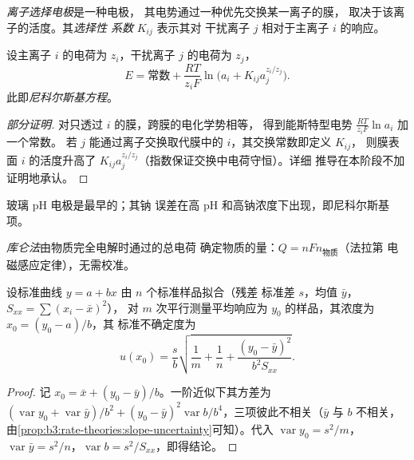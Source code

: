 \begin{definition}\label{def:b3:electrode-kinetics:ise}
\emph{离子选择电极}是一种电极，
其电势通过一种优先交换某一离子的膜，
取决于该离子的活度。其\emph{选择性
系数} $K_{ij}$ 表示其对
干扰离子 $j$ 相对于主离子 $i$ 的响应。
\end{definition}

\begin{proposition}[尼科尔斯基方程]\label{prop:b3:electrode-kinetics:nikolsky}
设主离子 $i$ 的电荷为 $z_i$，干扰离子 $j$ 的电荷为 $z_j$，
\[
  E = \text{常数} + \frac{RT}{z_iF}\ln\bigl(a_i + K_{ij}a_j^{z_i/z_j}\bigr) .
\]
此即\emph{尼科尔斯基方程}。
\end{proposition}

\begin{proof}[部分证明]
对只透过 $i$ 的膜，跨膜的电化学势相等，
得到能斯特型电势 $\frac{RT}{z_iF}\ln a_i$ 加一个常数。
若 $j$ 能通过离子交换取代膜中的 $i$，其交换常数即定义 $K_{ij}$，
则膜表面 $i$ 的活度升高了
$K_{ij}a_j^{z_i/z_j}$（指数保证交换中电荷守恒）。详细
推导在本阶段不加证明地承认。
\end{proof}

玻璃 pH 电极是最早的；其钠
误差在高 pH 和高钠浓度下出现，即尼科尔斯基项。

\begin{definition}[库仑法]\label{def:b3:electrode-kinetics:coulometry}
\emph{库仑法}由物质完全电解时通过的总电荷
确定物质的量：$Q = nFn_{\text{物质}}$（法拉第
电磁感应定律），无需校准。
\end{definition}

\begin{proposition}[由标准曲线读取浓度的不确定度]\label{prop:b3:electrode-kinetics:inverse-prediction}
设标准曲线 $y = a + bx$ 由 $n$ 个标准样品拟合（残差
标准差 $s$，均值 $\bar y$，$S_{xx} = \sum(x_i - \bar x)^2$），
对 $m$ 次平行测量平均响应为 $y_0$ 的样品，其浓度为 $x_0 = (y_0 - a)/b$，其
标准不确定度为
\[
  u(x_0) = \frac{s}{b}\sqrt{\frac1m + \frac1n + \frac{(y_0 - \bar y)^2}{b^2S_{xx}}} .
\]
\end{proposition}

\begin{proof}
记 $x_0 = \bar x + (y_0 - \bar y)/b$。一阶近似下其方差为 $(\operatorname{var}y_0 +
\operatorname{var}\bar y)/b^2 + (y_0 - \bar y)^2\operatorname{var}b/b^4$，三项彼此不相关（$\bar y$ 与 $b$
不相关，由\cref{prop:b3:rate-theories:slope-uncertainty}可知）。代入 $\operatorname{var}y_0 =
s^2/m$，$\operatorname{var}\bar y = s^2/n$，$\operatorname{var}b = s^2/S_{xx}$，即得结论。
\end{proof}


